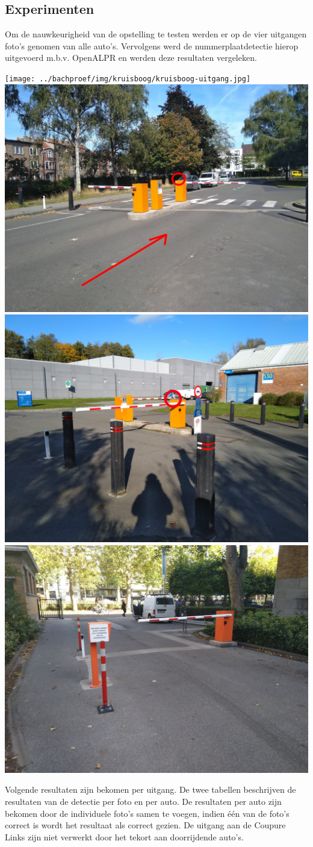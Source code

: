 \documentclass[a0,portrait]{a0poster}
\begin{document}
\begin{multicols}{2}
\color{Black} %
\color{HoGentAccent1} 

\section*{Experimenten}
\color{black}

Om de nauwkeurigheid van de opstelling te testen werden er op de vier uitgangen foto's genomen van alle auto's. Vervolgens werd de nummerplaatdetectie hierop uitgevoerd m.b.v. OpenALPR en werden deze resultaten vergeleken.

\begin{center}
	\centering
	\texttt{[image: ../bachproef/img/kruisboog/kruisboog-uitgang.jpg]}
	\includegraphics[width=0.4\linewidth]{../bachproef/img/res-galglaan/galg.jpg}
	\includegraphics[width=0.4\linewidth]{../bachproef/img/depintelaanorigineel.jpg}
	\includegraphics[width=0.4\linewidth]{../bachproef/img/coupure-links/coupure-links.jpg}
\end{center}

Volgende resultaten zijn bekomen per uitgang. De twee tabellen beschrijven de resultaten van de detectie per foto en per auto. De resultaten per auto zijn bekomen door de individuele foto's samen te voegen, indien één van de foto's correct is wordt het resultaat als correct gezien. De uitgang aan de Coupure Links zijn niet verwerkt door het tekort aan doorrijdende auto's.


\end{multicols}
\end{document}
